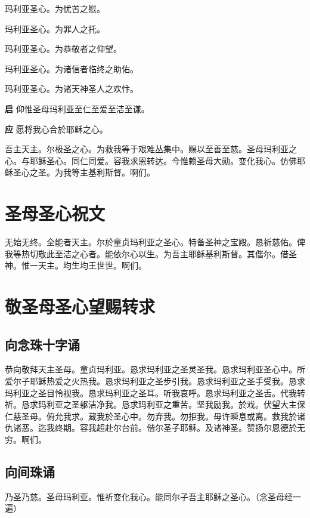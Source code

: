 \documentclass[UTF8,17pt]{ctexart}
\begin{document}
 玛利亚圣⼼。为忧苦之慰。

 玛利亚圣⼼。为罪⼈之托。

 玛利亚圣⼼。为恭敬者之仰望。

 玛利亚圣⼼。为诸信者临终之助佑。

 玛利亚圣⼼。为诸天神圣⼈之欢忭。

\textbf{启} \quad 仰惟圣母玛利亚⾄仁⾄爱⾄洁⾄谦。

\textbf{应} \quad 愿将我⼼合於耶稣之⼼。

吾主天主。尔极圣之⼼。为救我等于艰难丛集中。赐以⾄善⾄慈。圣母玛利亚之⼼。与耶稣圣⼼。同仁同爱。容我求恩转达。今惟赖圣母⼤勋。变化我⼼。仿佛耶稣圣⼼之圣。为我等主基利斯督。啊们。

\section{圣母圣⼼祝⽂}

⽆始⽆终。全能者天主。尔於童贞玛利亚之圣⼼。特备圣神之宝殿。恳祈慈佑。俾我等热切敬此⾄洁之⼼者。能依尔⼼以⽣。为吾主耶稣基利斯督。其偕尔。借圣神。惟⼀天主。均⽣均王世世。啊们。

\section{敬圣母圣⼼望赐转求}

\subsection{向念珠⼗字诵}

恭向敬拜天主圣母。童贞玛利亚。恳求玛利亚之圣灵圣我。恳求玛利亚圣⼼中。所爱尔⼦耶稣热爱之⽕热我。恳求玛利亚之圣步引我。恳求玛利亚之圣⼿受我。恳求玛利亚之圣⽬怜视我。恳求玛利亚之圣⽿。听我哀呼。恳求玛利亚之圣⾆。代我转祈。恳求玛利亚之圣躯洁净我。恳求玛利亚之重苦。坚我励我。於戏。伏望⼤主保仁慈圣母。俯允我求。藏我於圣⼼中。勿弃我。勿拒我。⽏许瞬息或离。救我於诸仇诸恶。迄我终期。容我超赴尔台前。偕尔圣⼦耶稣。及诸神圣。赞扬尔恩德於⽆穷。啊们。

\subsection{向间珠诵}

乃圣乃慈。圣母玛利亚。惟祈变化我⼼。能同尔⼦吾主耶稣之圣⼼。（念圣母经⼀遍）
\end{document}
